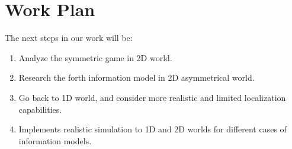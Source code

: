 \documentclass[a4paper,english,10pt]{article}
\begin{document}
\section{Work Plan}
The next steps in our work will be:
\begin{enumerate}
\item Analyze the symmetric game in 2D world.
\item Research the forth information model in 2D asymmetrical world.
\item Go back to 1D world, and consider more realistic and limited localization capabilities.
\item Implements realistic simulation to 1D and 2D worlds for different cases of information models.
\end{enumerate}




\end{document}

